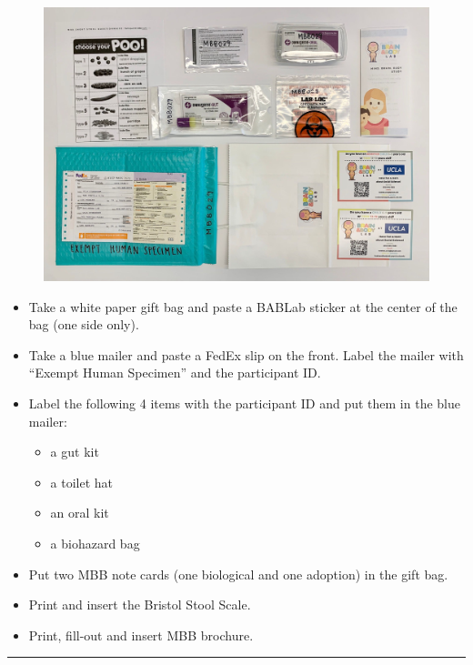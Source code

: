 \documentclass[]{book}
\providecommand{\tightlist}{%
  \setlength{\itemsep}{0pt}\setlength{\parskip}{0pt}}
\begin{document}
\begin{figure}
\centering
\includegraphics{images/home_kit/1.jpeg}
\caption{}
\end{figure}

\begin{itemize}
\tightlist
\item
  Take a white paper gift bag and paste a BABLab sticker at the center of the bag (one side only).
\item
  Take a blue mailer and paste a FedEx slip on the front. Label the mailer with ``Exempt Human Specimen'' and the participant ID.
\item
  Label the following 4 items with the participant ID and put them in the blue mailer:

  \begin{itemize}
  \tightlist
  \item
    a gut kit
  \item
    a toilet hat
  \item
    an oral kit
  \item
    a biohazard bag
  \end{itemize}
\item
  Put two MBB note cards (one biological and one adoption) in the gift bag.
\item
  Print and insert the Bristol Stool Scale.
\item
  Print, fill-out and insert MBB brochure.
\end{itemize}

\begin{center}\rule{0.5\linewidth}{0.5pt}\end{center}
\end{document}
